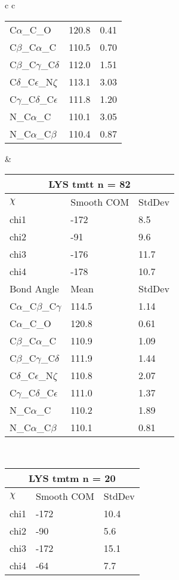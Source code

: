 \begin{longtable}{ c c }
\begin{tabular}{ l l l }
  C$\alpha$\_C\_O & 120.8 & 0.41\\
  C$\beta$\_C$\alpha$\_C & 110.5 & 0.70\\
  C$\beta$\_C$\gamma$\_C$\delta$ & 112.0 & 1.51\\
  C$\delta$\_C$\epsilon$\_N$\zeta$ & 113.1 & 3.03\\
  C$\gamma$\_C$\delta$\_C$\epsilon$ & 111.8 & 1.20\\
  N\_C$\alpha$\_C & 110.1 & 3.05\\
  N\_C$\alpha$\_C$\beta$ & 110.4 & 0.87\\
  \bottomrule
  \end{tabular}
  &
  \begin{tabular}{ l l l }
  \toprule
  \multicolumn{3}{c}{LYS \textbf{tmtt} n = 82} \\ \toprule
  $\chi$       & Smooth COM & StdDev \\ \midrule
  chi1 & -172 & 8.5 \\ 
  chi2 & -91 & 9.6 \\ 
  chi3 & -176 & 11.7 \\ 
  chi4 & -178 & 10.7 \\ \midrule
  Bond Angle   & Mean     & StdDev \\ \midrule
  C$\alpha$\_C$\beta$\_C$\gamma$ & 114.5 & 1.14\\
  C$\alpha$\_C\_O & 120.8 & 0.61\\
  C$\beta$\_C$\alpha$\_C & 110.9 & 1.09\\
  C$\beta$\_C$\gamma$\_C$\delta$ & 111.9 & 1.44\\
  C$\delta$\_C$\epsilon$\_N$\zeta$ & 110.8 & 2.07\\
  C$\gamma$\_C$\delta$\_C$\epsilon$ & 111.0 & 1.37\\
  N\_C$\alpha$\_C & 110.2 & 1.89\\
  N\_C$\alpha$\_C$\beta$ & 110.1 & 0.81\\
  \bottomrule
  \end{tabular}
  \\
  \begin{tabular}{ l l l }
  \toprule
  \multicolumn{3}{c}{LYS \textbf{tmtm} n = 20} \\ \toprule
  $\chi$       & Smooth COM & StdDev \\ \midrule
  chi1 & -172 & 10.4 \\ 
  chi2 & -90 & 5.6 \\ 
  chi3 & -172 & 15.1 \\ 
  chi4 & -64 & 7.7 \\ \midrule

\end{tabular}
\end{longtable}
